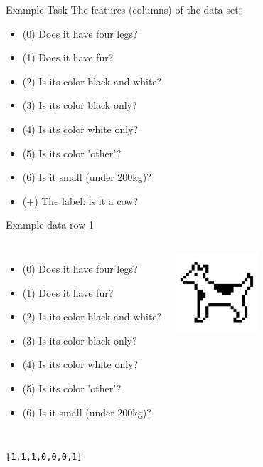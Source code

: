 \documentclass[15pt]{beamer}
\begin{document}
\begin{frame}{Example Task}
    The features (columns) of the data set:
    \vspace{2mm}
    \begin{itemize}\itemsep0.5em
        \item (0) Does it have four legs?
        \item (1) Does it have fur?
        \item (2) Is its color black and white?
        \item (3) Is its color black only?
        \item (4) Is its color white only?
        \item (5) Is its color 'other'?
        \item (6) Is it small (under 200kg)?
        \item (+) The label: is it a cow?
    \end{itemize}
\end{frame}


\begin{frame}{Example data row 1}
    \begin{columns}[b]
        \small
        \begin{itemize}\itemsep0.25em
            \item (0) Does it have four legs?
            \item (1) Does it have fur?
            \item (2) Is its color black and white?
            \item (3) Is its color black only?
            \item (4) Is its color white only?
            \item (5) Is its color 'other'?
            \item (6) Is it small (under 200kg)?
        \end{itemize}
        \includegraphics[height=30mm]{img/dog_01.jpg}
    \end{columns}

    \vspace{6mm}
    \normalsize
    \hspace{68mm}\texttt{[1,1,1,0,0,0,1]}
\end{frame}
\end{document}

